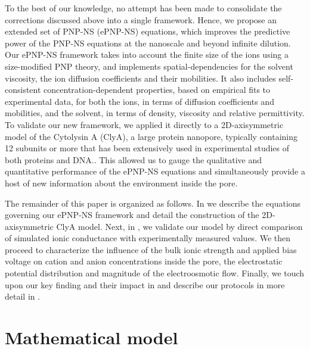 \documentclass[journal=ancac3,manuscript=article,etalmode=truncate,maxauthors=0,layout=onecolumn]{achemso}
\begin{document}
To the best of our knowledge, no attempt has been made to consolidate the
corrections discussed above into a single framework. Hence, we propose an
extended set of PNP-NS (ePNP-NS) equations, which improves the predictive power
of the PNP-NS equations at the nanoscale and beyond infinite dilution. Our
ePNP-NS framework takes into account the finite size of the ions using a
size-modified PNP theory,\cite{Lu-2011} and implements spatial-dependencies for
the solvent viscosity,\cite{Pronk-2014,Hsu-2017} the ion diffusion coefficients
and their mobilities.\cite{Makarov-1998,Noskov-2004} It also includes
self-consistent concentration-dependent properties, based on empirical fits to
experimental data, for both the ions, in terms of diffusion coefficients and
mobilities,\cite{Baldessari-2008-1,Mills-1989} and the solvent, in terms of
density, viscosity\cite{Hai-Lang-1996} and relative
permittivity\cite{Gavish-2016}. To validate our new framework, we applied it
directly to a 2D-axisymmetric model of the Cytolysin A (ClyA), a large protein
nanopore, typically containing 12 subunits\cite{Mueller-2009} or
more\cite{Soskine-2013} that has been extensively used in experimental studies
of both proteins\cite{Soskine-2013,VanMeervelt-2014,Soskine-Biesemans-2015,
Biesemans-Soskine-2015,Wloka-2017,VanMeervelt-2017,Galenkamp-2018} and
DNA.\cite{Franceschini-2013, Franceschini-2016}. This allowed us to gauge the
qualitative and quantitative performance of the ePNP-NS equations and
simultaneously provide a host of new information about the environment inside
the pore.

The remainder of this paper is organized as follows. In
\emph{} we describe the equations governing our ePNP-NS
framework and detail the construction of the 2D-axisymmetric ClyA model. Next,
in \emph{}, we validate our model by direct comparison of
simulated ionic conductance with experimentally measured values. We then
proceed to characterize the influence of the bulk ionic strength and applied
bias voltage on cation and anion concentrations inside the pore, the
electrostatic potential distribution and magnitude of the electroosmotic flow.
Finally, we touch upon our key finding and their impact in
\emph{} and describe our protocols in more detail in
\emph{}.




\section{Mathematical model}\label{sec:model}
\end{document}
